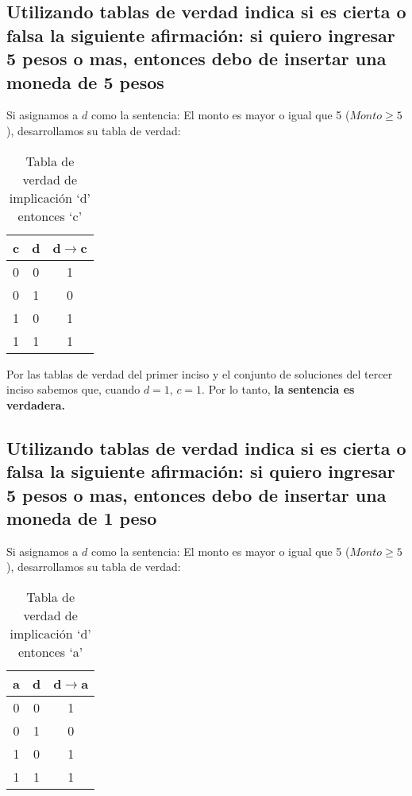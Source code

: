 \subsection{Utilizando tablas de verdad indica si es cierta o falsa la siguiente afirmación: si quiero ingresar 5 pesos o mas, entonces debo de insertar una moneda de 5 pesos}
Si asignamos a $d$ como la sentencia: El monto es mayor o igual que 5 ($Monto \geq 5$), desarrollamos su tabla de verdad:

\begin{table}[!ht]
    \centering
    \begin{tabular}{|c|c|c|}
        \hline
        c & d & d$\rightarrow$c \\
        \hline
        0 & 0 & 1 \\
        \hline
        0 & 1 & 0 \\
        \hline
        1 & 0 & 1 \\
        \hline
        1 & 1 & 1 \\
        \hline
    \end{tabular}
    \caption{Tabla de verdad de implicación `d' entonces `c'}\label{table:d-then-c}
\end{table}

Por las tablas de verdad del primer inciso y el conjunto de soluciones del tercer inciso sabemos que, cuando $d = 1$, $c = 1$.
Por lo tanto, \textbf{la sentencia es verdadera.}

\subsection{Utilizando tablas de verdad indica si es cierta o falsa la siguiente afirmación: si quiero ingresar 5 pesos o mas, entonces debo de insertar una moneda de 1 peso}
Si asignamos a $d$ como la sentencia: El monto es mayor o igual que 5 ($Monto \geq 5$), desarrollamos su tabla de verdad:

\begin{table}[!ht]
    \centering
    \begin{tabular}{|c|c|c|}
        \hline
        a & d & d$\rightarrow$a \\
        \hline
        0 & 0 & 1 \\
        \hline
        0 & 1 & 0 \\
        \hline
        1 & 0 & 1 \\
        \hline
        1 & 1 & 1 \\
        \hline
    \end{tabular}
    \caption{Tabla de verdad de implicación `d' entonces `a'}\label{table:d-then-a}
\end{table}

